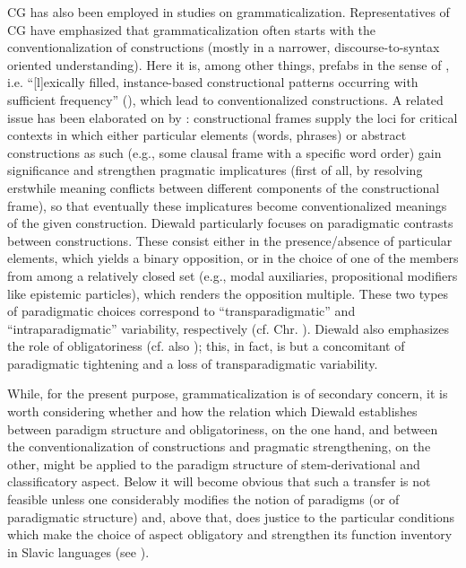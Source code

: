 \documentclass[output=paper]{langscibook}
\begin{document}
CG has also been employed in studies on grammaticalization. Representatives of CG have emphasized that grammaticalization often starts with the conventionalization of constructions (mostly in a narrower, discourse-to-syntax oriented understanding). Here it is, among other things, prefabs in the sense of \citet[55]{Bybee2010}, i.e. “[l]exically filled, instance-based constructional patterns occurring with sufficient frequency” (\citealt[26--27]{Nikiforidou2009}), which lead to conventionalized constructions. A related issue has been elaborated on by \citet{Diewald2009}: constructional frames supply the loci for critical contexts in which either particular elements (words, phrases) or abstract constructions as such (e.g., some clausal frame with a specific word order) gain significance and strengthen pragmatic implicatures (first of all, by resolving erstwhile meaning conflicts between different components of the constructional frame), so that eventually these implicatures become conventionalized meanings of the given construction. Diewald particularly focuses on paradigmatic contrasts between constructions. These consist either in the presence/absence of particular elements, which yields a binary opposition, or in the choice of one of the members from among a relatively closed set (e.g., modal auxiliaries, propositional modifiers like epistemic particles), which renders the opposition multiple. These two types of paradigmatic choices correspond to ``transparadigmatic'' and ``intraparadigmatic'' variability, respectively (cf. Chr. \citealt[138--139]{Lehmann1995}). Diewald also emphasizes the role of obligatoriness (cf. also \citealt{DiewaldSmirnova2010}); this, in fact, is but a concomitant of paradigmatic tightening and a loss of transparadigmatic variability.

While, for the present purpose, grammaticalization is of secondary concern, it is worth considering whether and how the relation which Diewald establishes between paradigm structure and obligatoriness, on the one hand, and between the conventionalization of constructions and pragmatic strengthening, on the other, might be applied to the paradigm structure of stem-derivational and classificatory aspect. Below it will become obvious that such a transfer is not feasible unless one considerably modifies the notion of paradigms (or of paradigmatic structure) and, above that, does justice to the particular conditions which make the choice of aspect obligatory and strengthen its function inventory in Slavic languages (see ).
\end{document}
